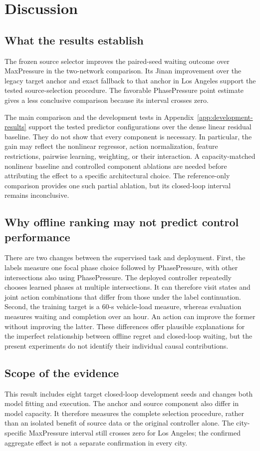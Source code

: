 \section{Discussion}
\subsection{What the results establish}
The frozen source selector improves the paired-seed waiting outcome over MaxPressure in the two-network comparison. Its Jinan improvement over the legacy target anchor and exact fallback to that anchor in Los Angeles support the tested source-selection procedure. The favorable PhasePressure point estimate gives a less conclusive comparison because its interval crosses zero.

The main comparison and the development tests in Appendix~\ref{app:development-results} support the tested predictor configurations over the dense linear residual baseline. They do not show that every component is necessary. In particular, the gain may reflect the nonlinear regressor, action normalization, feature restrictions, pairwise learning, weighting, or their interaction. A capacity-matched nonlinear baseline and controlled component ablations are needed before attributing the effect to a specific architectural choice. The reference-only comparison provides one such partial ablation, but its closed-loop interval remains inconclusive.

\subsection{Why offline ranking may not predict control performance}
There are two changes between the supervised task and deployment. First, the labels measure one focal phase choice followed by PhasePressure, with other intersections also using PhasePressure. The deployed controller repeatedly chooses learned phases at multiple intersections. It can therefore visit states and joint action combinations that differ from those under the label continuation. Second, the training target is a 60-s vehicle-load measure, whereas evaluation measures waiting and completion over an hour. An action can improve the former without improving the latter. These differences offer plausible explanations for the imperfect relationship between offline regret and closed-loop waiting, but the present experiments do not identify their individual causal contributions.

\subsection{Scope of the evidence}
This result includes eight target closed-loop development seeds and changes both model fitting and execution. The anchor and source component also differ in model capacity. It therefore measures the complete selection procedure, rather than an isolated benefit of source data or the original controller alone. The city-specific MaxPressure interval still crosses zero for Los Angeles; the confirmed aggregate effect is not a separate confirmation in every city.

